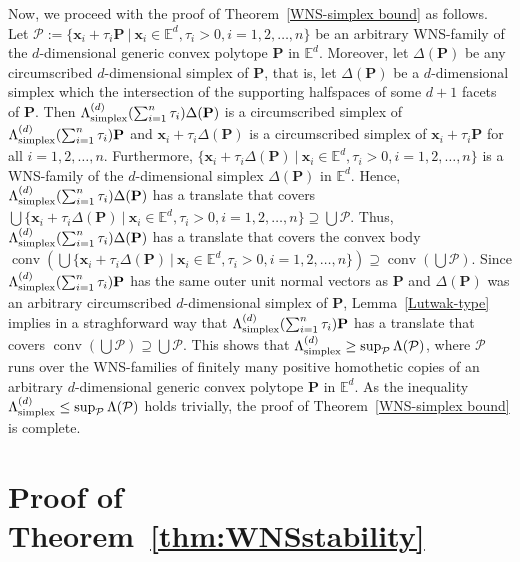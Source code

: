\documentclass[12pt]{article}
\DeclareMathOperator{\conv}{conv}
\newcommand{\xx}{\mathbf{x}}
\newcommand{\Ee}{{\mathbb E}}
\begin{document}
Now, we proceed with the proof of Theorem~\ref{WNS-simplex bound} as follows. Let $\mathcal{P} := \{ \xx_i + \tau_i \mathbf{P}\ |\  \xx_i\in \Ee^d, \tau_i>0, i=1,2,\ldots, n\}$ be an arbitrary WNS-family of the $d$-dimensional generic convex polytope $\mathbf{P}$ in $\Ee^d$. Moreover, let $\Delta(\mathbf{P})$ be any circumscribed $d$-dimensional simplex of $\mathbf{P}$, that is, let $\Delta(\mathbf{P})$ be a $d$-dimensional simplex which the intersection of the supporting halfspaces of some $d+1$ facets of $\mathbf{P}$. Then $\Lambda_{\rm simplex}^{(d)} ( \sum_{i=1}^n \tau_i ) \Delta(\mathbf{P})$ is a circumscribed simplex of $\Lambda_{\rm simplex}^{(d)} ( \sum_{i=1}^n \tau_i ) \mathbf{P}$ and $\xx_i + \tau_i \Delta(\mathbf{P})$ is a circumscribed simplex of $ \xx_i + \tau_i \mathbf{P}$ for all $i=1,2,\ldots, n$. Furthermore, $\{ \xx_i + \tau_i \Delta(\mathbf{P})\ |\  \xx_i\in \Ee^d, \tau_i>0, i=1,2,\ldots, n\}$ is a WNS-family of the $d$-dimensional simplex $\Delta(\mathbf{P})$ in $\Ee^d$. Hence, $\Lambda_{\rm simplex}^{(d)} ( \sum_{i=1}^n \tau_i ) \Delta(\mathbf{P})$ has a translate that covers $\bigcup \{ \xx_i + \tau_i \Delta(\mathbf{P})\ |\  \xx_i\in \Ee^d, \tau_i>0, i=1,2,\ldots, n\}\supseteq   \bigcup \mathcal{P}$. Thus, $\Lambda_{\rm simplex}^{(d)}  ( \sum_{i=1}^n \tau_i ) \Delta(\mathbf{P})$ has a translate that covers the convex body $\conv\left( \bigcup \{ \xx_i + \tau_i \Delta(\mathbf{P})\ |\  \xx_i\in \Ee^d, \tau_i>0, i=1,2,\ldots, n\} \right)\supseteq   \conv\left(\bigcup \mathcal{P}\right)$. Since $\Lambda_{\rm simplex}^{(d)}  ( \sum_{i=1}^n \tau_i ) \mathbf{P}$ has the same outer unit normal vectors as $\mathbf{P}$ and $\Delta(\mathbf{P})$ was an arbitrary circumscribed $d$-dimensional simplex of $\mathbf{P}$, Lemma~\ref{Lutwak-type} implies in a straghforward way that $\Lambda_{\rm simplex}^{(d)}  ( \sum_{i=1}^n \tau_i ) \mathbf{P}$ has a translate that covers $ \conv\left(\bigcup \mathcal{P}\right)\supseteq\bigcup \mathcal{P}$. This shows that $\Lambda_{\rm simplex}^{(d)}\geq \sup_{\mathcal{P}} \Lambda(\mathcal{P})$, where $\mathcal{P}$ runs over the WNS-families of finitely many positive homothetic copies of an arbitrary $d$-dimensional generic convex polytope $\mathbf{P}$ in $\Ee^d$. As the inequality $\Lambda_{\rm simplex}^{(d)}\leq \sup_{\mathcal{P}} \Lambda(\mathcal{P})$ holds trivially, the proof of Theorem~\ref{WNS-simplex bound} is complete. 

\section{Proof of Theorem~\ref{thm:WNSstability}}
\end{document}
